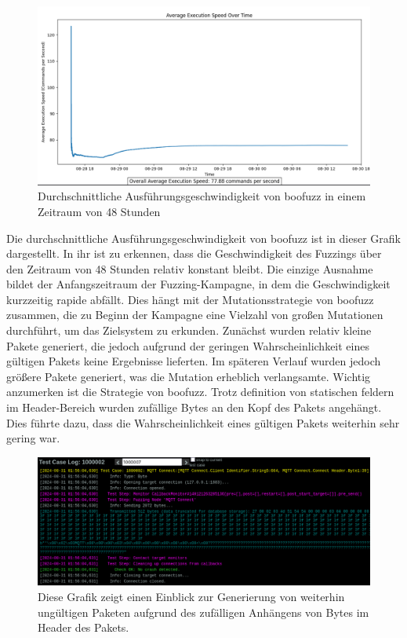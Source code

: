 \begin{figure}[H]
    \centering
    \includegraphics[width=\textwidth]{img/average_exec_speed_boofuzz_normal}
    \caption{Durchschnittliche Ausführungsgeschwindigkeit von boofuzz in einem Zeitraum von 48 Stunden}
    \label{fig:exec_speed_boo_normal}
\end{figure}
\noindent Die durchschnittliche Ausführungsgeschwindigkeit von boofuzz ist in dieser Grafik dargestellt.
In ihr ist zu erkennen, dass die Geschwindigkeit des Fuzzings über den Zeitraum von 48 Stunden relativ konstant bleibt.
Die einzige Ausnahme bildet der Anfangszeitraum der Fuzzing-Kampagne, in dem die Geschwindigkeit kurzzeitig rapide abfällt.
Dies hängt mit der Mutationsstrategie von boofuzz zusammen, die zu Beginn der Kampagne eine Vielzahl von großen Mutationen
durchführt, um das Zielsystem zu erkunden.
Zunächst wurden relativ kleine Pakete generiert, die jedoch aufgrund der geringen Wahrscheinlichkeit eines gültigen Pakets
keine Ergebnisse lieferten.
Im späteren Verlauf wurden jedoch größere Pakete generiert, was die Mutation erheblich verlangsamte.
Wichtig anzumerken ist die Strategie von boofuzz.
Trotz definition von statischen feldern im Header-Bereich wurden zufällige Bytes an den Kopf des Pakets angehängt.
Dies führte dazu, dass die Wahrscheinlichkeit eines gültigen Pakets weiterhin sehr gering war.
\begin{figure}[H]
    \centering
    \includegraphics[width=\textwidth]{img/boofuzz_case_log}
    \caption{Diese Grafik zeigt einen Einblick zur Generierung von weiterhin ungültigen Paketen aufgrund des zufälligen Anhängens von Bytes
    im Header des Pakets.}
    \label{fig:boo_case_log}
\end{figure}
